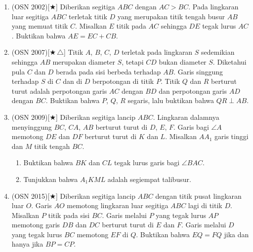 \documentclass[letterpaper, 13pt]{scrartcl}
\begin{document}
\begin{enumerate}

  \item (OSN 2002)[$\bigstar$] Diberikan segitiga $ABC$ dengan $AC > BC$. Pada lingkaran luar segitiga $ABC$ terletak titik $D$ yang merupakan titik tengah busur $AB$ yang memuat titik $C$. Misalkan $E$ titik pada $AC$ sehingga $DE$ tegak lurus $AC$. Buktikan bahwa $AE = EC + CB$.

  \item (OSN 2007)[$\bigstar\,\triangle$] Titik $A$, $B$, $C$, $D$ terletak pada lingkaran $S$ sedemikian sehingga $AB$ merupakan diameter $S$, tetapi $CD$ bukan diameter $S$. Diketahui pula $C$ dan $D$ berada pada sisi berbeda terhadap $AB$. Garis singgung terhadap $S$ di $C$ dan di $D$ berpotongan di titik $P$. Titik $Q$ dan $R$ berturut turut adalah perpotongan garis $AC$ dengan $BD$ dan perpotongan garis $AD$ dengan $BC$. Buktikan bahwa $P$, $Q$, $R$ segaris, lalu buktikan bahwa $QR \perp AB$.

  \item (OSN 2009)[$\bigstar$] Diberikan segitiga lancip $ABC$. Lingkaran dalamnya menyinggung $BC$, $CA$, $AB$ berturut turut di $D$, $E$, $F$. Garis bagi $\angle A$ memotong $DE$ dan $DF$ berturut turut di $K$ dan $L$. Misalkan $AA_1$ garis tinggi dan $M$ titik tengah $BC$.
  \begin{enumerate}
    \item[(a)] Buktikan bahwa $BK$ dan $CL$ tegak lurus garis bagi $\angle BAC$.
    \item[(b)] Tunjukkan bahwa $A_1KML$ adalah segiempat talibusur.
  \end{enumerate}

  \item (OSN 2015)[$\bigstar$] Diberikan segitiga lancip $ABC$ dengan titik pusat lingkaran luar $O$. Garis $AO$ memotong lingkaran luar segitiga $ABC$ lagi di titik $D$. Misalkan $P$ titik pada sisi $BC$. Garis melalui $P$ yang tegak lurus $AP$ memotong garis $DB$ dan $DC$ berturut turut di $E$ dan $F$. Garis melalui $D$ yang tegak lurus $BC$ memotong $EF$ di $Q$. Buktikan bahwa $EQ = FQ$ jika dan hanya jika $BP = CP$.


\end{enumerate}
\end{document}
